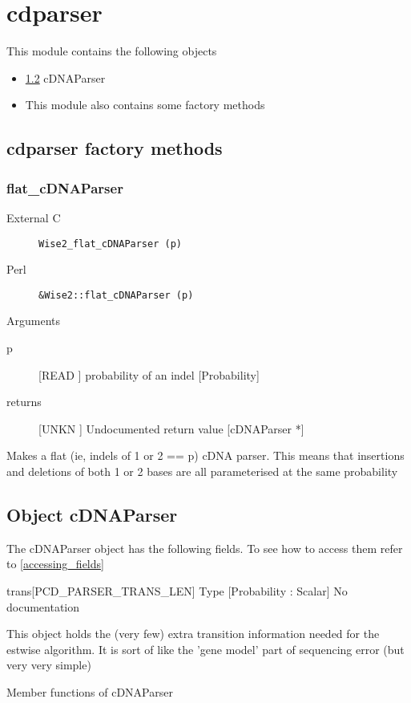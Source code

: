 \section{cdparser}
\label{module_cdparser}
This module contains the following objects

\begin{itemize}
\item \ref{object_cDNAParser} cDNAParser

\item This module also contains some factory methods
\end{itemize}
\subsection{cdparser factory methods}
\subsubsection{flat_cDNAParser}
\begin{description}
\item[External C] {\tt Wise2_flat_cDNAParser (p)}
\item[Perl] {\tt &Wise2::flat_cDNAParser (p)}

\end{description}
Arguments
\begin{description}
\item[p] [READ ] probability of an indel [Probability]
\item[returns] [UNKN ] Undocumented return value [cDNAParser *]
\end{description}
Makes a flat (ie, indels of 1 or 2 == p)
cDNA parser. This means that insertions
and deletions of both 1 or 2 bases are
all parameterised at the same probability






\subsection{Object cDNAParser}

\label{object_cDNAParser}

The cDNAParser object has the following fields. To see how to access them refer to \ref{accessing_fields}
\begin{description}
\item{trans[PCD_PARSER_TRANS_LEN]} Type [Probability : Scalar] No documentation

\end{description}
This object holds the (very few) extra
transition information needed for the
estwise algorithm. It is sort of like
the 'gene model' part of sequencing
error (but very very simple)






Member functions of cDNAParser

